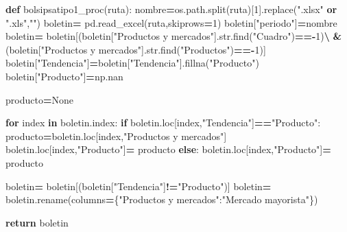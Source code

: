 \documentclass[
]{book}
\newenvironment{Shaded}{\begin{snugshade}}{\end{snugshade}}
\newcommand{\BuiltInTok}[1]{#1}
\newcommand{\ControlFlowTok}[1]{\textcolor[rgb]{0.13,0.29,0.53}{\textbf{#1}}}
\newcommand{\DecValTok}[1]{\textcolor[rgb]{0.00,0.00,0.81}{#1}}
\newcommand{\KeywordTok}[1]{\textcolor[rgb]{0.13,0.29,0.53}{\textbf{#1}}}
\newcommand{\NormalTok}[1]{#1}
\newcommand{\OperatorTok}[1]{\textcolor[rgb]{0.81,0.36,0.00}{\textbf{#1}}}
\newcommand{\StringTok}[1]{\textcolor[rgb]{0.31,0.60,0.02}{#1}}
\newcommand{\VariableTok}[1]{\textcolor[rgb]{0.00,0.00,0.00}{#1}}
\begin{document}
\begin{Shaded}
\begin{Highlighting}[]

\KeywordTok{def}\NormalTok{ bolsipsatipo1\_proc(ruta):}
\NormalTok{    nombre}\OperatorTok{=}\NormalTok{os.path.split(ruta)[}\DecValTok{1}\NormalTok{].replace(}\StringTok{".xlsx"} \KeywordTok{or} \StringTok{".xls"}\NormalTok{,}\StringTok{""}\NormalTok{)}
\NormalTok{    boletin}\OperatorTok{=}\NormalTok{ pd.read\_excel(ruta,skiprows}\OperatorTok{=}\DecValTok{1}\NormalTok{)}
\NormalTok{    boletin[}\StringTok{"periodo"}\NormalTok{]}\OperatorTok{=}\NormalTok{nombre}
\NormalTok{    boletin}\OperatorTok{=}\NormalTok{ boletin[(boletin[}\StringTok{"Productos y mercados"}\NormalTok{].}\BuiltInTok{str}\NormalTok{.find(}\StringTok{"Cuadro"}\NormalTok{)}\OperatorTok{=={-}}\DecValTok{1}\NormalTok{)}\OperatorTok{\textbackslash{}}
                     \OperatorTok{\&}\NormalTok{ (boletin[}\StringTok{"Productos y mercados"}\NormalTok{].}\BuiltInTok{str}\NormalTok{.find(}\StringTok{"Productos"}\NormalTok{)}\OperatorTok{=={-}}\DecValTok{1}\NormalTok{)]}
\NormalTok{    boletin[}\StringTok{"Tendencia"}\NormalTok{]}\OperatorTok{=}\NormalTok{boletin[}\StringTok{"Tendencia"}\NormalTok{].fillna(}\StringTok{"Producto"}\NormalTok{)}
\NormalTok{    boletin[}\StringTok{"Producto"}\NormalTok{]}\OperatorTok{=}\NormalTok{np.nan }
    
\NormalTok{    producto}\OperatorTok{=}\VariableTok{None}
    
    \ControlFlowTok{for}\NormalTok{ index }\KeywordTok{in}\NormalTok{ boletin.index:}
        \ControlFlowTok{if}\NormalTok{ boletin.loc[index,}\StringTok{"Tendencia"}\NormalTok{]}\OperatorTok{==}\StringTok{"Producto"}\NormalTok{:}
\NormalTok{            producto}\OperatorTok{=}\NormalTok{boletin.loc[index,}\StringTok{"Productos y mercados"}\NormalTok{]}
\NormalTok{            boletin.loc[index,}\StringTok{"Producto"}\NormalTok{]}\OperatorTok{=}\NormalTok{ producto}
        \ControlFlowTok{else}\NormalTok{:}
\NormalTok{            boletin.loc[index,}\StringTok{"Producto"}\NormalTok{]}\OperatorTok{=}\NormalTok{ producto}
    
\NormalTok{    boletin}\OperatorTok{=}\NormalTok{ boletin[(boletin[}\StringTok{"Tendencia"}\NormalTok{]}\OperatorTok{!=}\StringTok{"Producto"}\NormalTok{)] }
\NormalTok{    boletin}\OperatorTok{=}\NormalTok{ boletin.rename(columns}\OperatorTok{=}\NormalTok{\{}\StringTok{"Productos y mercados"}\NormalTok{:}\StringTok{"Mercado mayorista"}\NormalTok{\})}
    
    \ControlFlowTok{return}\NormalTok{ boletin }
\end{Highlighting}
\end{Shaded}
\end{document}
